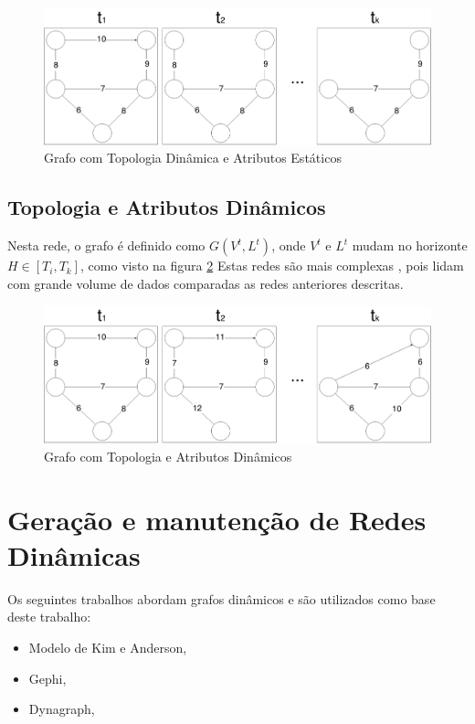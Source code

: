 \begin{figure}[htbp]
\centering
 \includegraphics[width=.99\textwidth]{chapters/fig/tdae.png}
\caption{Grafo com Topologia Dinâmica e Atributos Estáticos}
\label{fig:tdae}
\end{figure}

\FloatBarrier

\subsection{Topologia e Atributos Dinâmicos}
Nesta rede, o grafo é definido como $G(V^t, L^t)$, onde $V^t$ e $L^t$ mudam no horizonte $H \in [T_i, T_k]$, como
visto na figura \ref{fig:tdat}
Estas redes são mais complexas \cite{dynagraph}, pois lidam com grande volume de dados comparadas as redes anteriores descritas.

\begin{figure}[htbp]
\centering
 \includegraphics[width=.99\textwidth]{chapters/fig/tdat.png}
\caption{Grafo com Topologia e Atributos Dinâmicos}
\label{fig:tdat}
\end{figure}

\FloatBarrier

\section{Geração e manutenção de Redes Dinâmicas}
Os seguintes trabalhos abordam grafos dinâmicos e são utilizados como base deste trabalho:
\begin{itemize}
\item Modelo de Kim e Anderson, \cite{kim}
\item Gephi, \cite{gephi}
\item Dynagraph, \cite{dynagraph}
\end{itemize}



